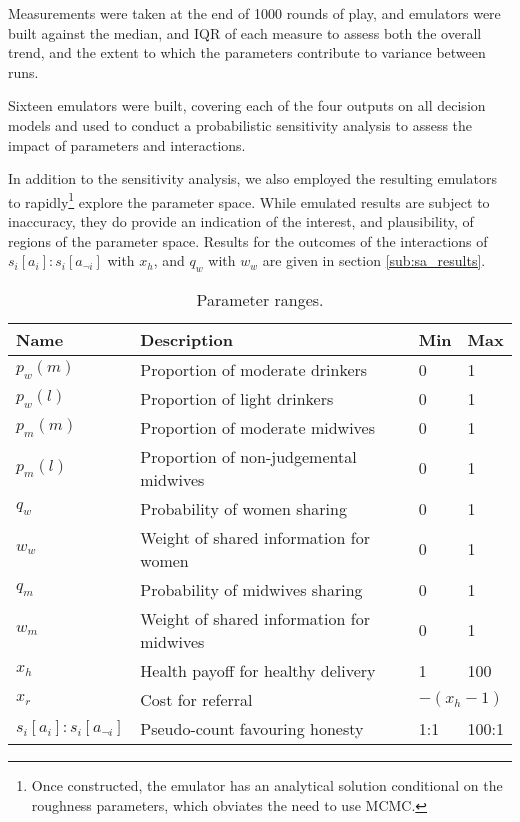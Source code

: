 Measurements were taken at the end of 1000 rounds of play, and emulators were built against the median, and \ac{IQR} of each measure to assess both the overall trend, and the extent to which the parameters contribute to variance between runs.

Sixteen emulators were built, covering each of the four outputs on all decision models and used to conduct a probabilistic sensitivity analysis to assess the impact of parameters and interactions.

In addition to the sensitivity analysis, we also employed the resulting emulators to rapidly\footnote{Once constructed, the emulator has an analytical solution conditional on the roughness parameters, which obviates the need to use MCMC.} explore the parameter space. While emulated results are subject to inaccuracy, they do provide an indication of the interest, and plausibility, of regions of the parameter space. Results for the outcomes of the interactions of \(s_{i}[a_{i}]:s_{i}[a_{\neg i}]\) with \(x_{h}\), and \(q_{w}\) with \(w_{w}\) are given in section \ref{sub:sa_results}.

\begin{table}
\caption{Parameter ranges.}
\label{tab:sa_params}
\begin{tabular} {llll}
\hline
Name & Description & Min & Max \\ \hline
\(p_{w}(m)\) & Proportion of moderate drinkers & 0 & 1 \\ \hline
\(p_{w}(l)\) & Proportion of light drinkers & 0 & 1 \\ \hline
\(p_{m}(m)\) & Proportion of moderate midwives & 0 & 1 \\ \hline
\(p_{m}(l)\) & Proportion of non-judgemental midwives & 0 & 1 \\ \hline
\(q_{w}\) & Probability of women sharing & 0 & 1 \\ \hline
\(w_{w}\) & Weight of shared information for women & 0 & 1 \\ \hline
\(q_{m}\) & Probability of midwives sharing & 0 & 1 \\ \hline
\(w_{m}\) & Weight of shared information for midwives & 0 & 1 \\ \hline
\(x_{h}\) & Health payoff for healthy delivery & 1 & 100 \\ \hline
\(x_{r}\) & Cost for referral & \multicolumn{2}{l|}{\(-(x_{h} - 1)\)} \\ \hline
\(s_{i}[a_{i}]:s_{i}[a_{\neg i}]\) & Pseudo-count favouring honesty & 1:1 & 100:1 \\ \hline
\end{tabular}
\end{table}